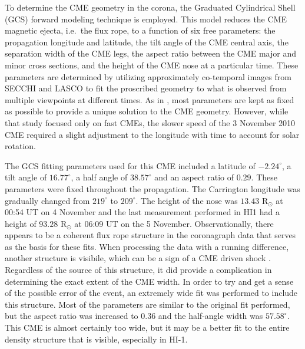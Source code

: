 \documentclass[draft]{agujournal}
\begin{document}
To determine the CME geometry in the corona, the Graduated Cylindrical Shell (GCS) forward modeling technique \citep{the06, the09} is employed. This model reduces the CME magnetic ejecta, i.e.\ the flux rope, to a function of six free parameters: the propagation longitude and latitude, the tilt angle of the CME central axis, the separation width of the CME legs, the aspect ratio between the CME major and minor cross sections, and the height of the CME nose at a particular time. These parameters are determined by utilizing approximately co-temporal images from SECCHI and LASCO to fit the proscribed geometry to what is observed from multiple viewpoints at different times. As in \citet{hes15}, most parameters are kept as fixed as possible to provide a unique solution to the CME geometry. However, while that study focused only on fast CMEs, the slower speed of the 3 November 2010 CME required a slight adjustment to the longitude with time to account for solar rotation. 


The GCS fitting parameters used for this CME included a latitude of $-2.24^\circ$, a tilt angle of $16.77^\circ$, a half angle of $38.57^\circ$ and an aspect ratio of $0.29$. These parameters were fixed throughout the propagation. The Carrington longitude was gradually changed from $219^\circ$ to $209^\circ$. The height of the nose was $13.43$ R$_{\odot}$ at 00:54 UT on 4 November and the last measurement performed in HI1 had a height of $93.28$ R$_{\odot}$ at 06:09 UT on the 5 November.
Observationally, there appears to be a coherent flux rope structure in the coronagraph data that serves as the basis for these fits. When processing the data with a running difference, another structure is visibile, which can be a sign of a CME driven shock \citep{hes14}. Regardless of the source of this structure, it did provide a complication in determining the exact extent of the CME width. 
In order to try and get a sense of the possible error of the event, an extremely wide fit was performed to include this structure. Most of the parameters are similar to the original fit performed, but the aspect ratio was increased to $0.36$ and the half-angle width was $57.58^\circ$. This CME is almost certainly too wide, but it may be a better fit to the entire density structure that is visible, especially in HI-1.
\end{document}
